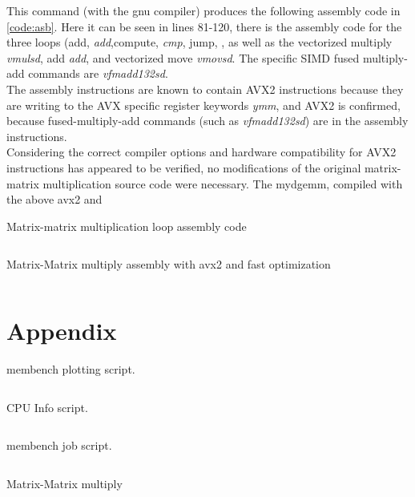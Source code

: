 \documentclass[letterpaper]{article}
\newenvironment{longlisting}{\captionsetup{type=listing}}{}
\newcommand{\code}[4]{
\begin{longlisting}
    \caption{#3}
    \inputminted[linenos]{#1}{#2}
    \label{code:#4}
\end{longlisting}
}
\begin{document}
This command (with the gnu compiler) produces the following assembly code in \cref{code:asb}. Here it can be seen in lines 81-120, there is the assembly code for the three loops (add, \textit{add},compute, \textit{cmp}, jump, , as well as the vectorized multiply \textit{vmulsd}, add \textit{add}, and vectorized move \textit{vmovsd}. The specific SIMD fused multiply-add commands are \textit{vfmadd132sd}. \\

The assembly instructions are known to contain AVX2 instructions because they are writing to the AVX specific register keywords \textit{ymm}, and AVX2 is confirmed, because fused-multiply-add commands (such as \textit{vfmadd132sd}) are in the assembly instructions.\\

Considering the correct compiler options and hardware compatibility for AVX2 instructions has appeared to be verified, no modifications of the original matrix-matrix multiplication source code were necessary. The mydgemm, compiled with the above avx2 and 


\begin{longlisting}
    \caption{Matrix-matrix multiplication loop assembly code}
    \inputminted[linenos,firstline=81,lastline=120]{bash}{figures/dgemm.s}
    \label{code:asb_}
\end{longlisting}


\code{cpp}{figures/dgemm.s}{Matrix-Matrix multiply assembly with avx2 and fast optimization}{asb}





\newpage
\section{Appendix}
\appendix
\begin{appendix}
\code{python}{figures/membench.py}{membench plotting script.}{membench}
\newpage
\code{bash}{figures/calc.sh}{CPU Info script.}{calc}
\newpage
\code{bash}{figures/job.slurm}{membench job script.}{job}
\newpage
\code{cpp}{figures/dgemm.cpp}{Matrix-Matrix multiply}{dgemm}
\end{appendix}


\end{document}
